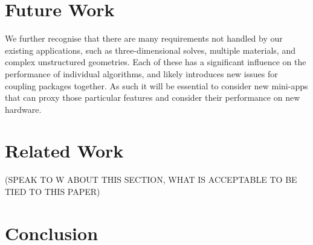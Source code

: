 \documentclass[runningheads,a4paper]{llncs}
\begin{document}
\section{Future Work}

We further recognise that there are many requirements not handled by our existing applications, such as three-dimensional solves, multiple materials, and complex unstructured geometries. Each of these has a significant influence on the performance of individual algorithms, and likely introduces new issues for coupling packages together. As such it will be essential to consider new mini-apps that can proxy those particular features and consider their performance on new hardware.

\section{Related Work}

(SPEAK TO W ABOUT THIS SECTION, WHAT IS ACCEPTABLE TO BE TIED TO THIS PAPER)

\section{Conclusion}



\end{document}
